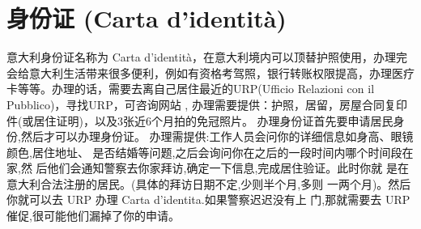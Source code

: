 \section{身份证 (Carta d'identità)}
意大利身份证名称为 Carta d'identità，在意大利境内可以顶替护照使用，办理完会给意大利生活带来很多便利，例如有资格考驾照，银行转账权限提高，办理医疗卡等等。办理的话，需要去离自己居住最近的URP(Ufficio Relazioni con il Pubblico)，寻找URP，可咨询网站 \cite{cid}, 办理需要提供：护照，居留，房屋合同复印件(或居住证明)，以及3张近6个月拍的免冠照片。
办理身份证首先要申请居民身份,然后才可以办理身份证。 办理需提供:工作人员会问你的详细信息如身高、眼镜颜色,居住地址、 是否结婚等问题,之后会询问你在之后的一段时间内哪个时间段在家,然 后他们会通知警察去你家拜访,确定一下信息,完成居住验证。此时你就 是在意大利合法注册的居民。(具体的拜访日期不定,少则半个月,多则 一两个月)。然后你就可以去 URP 办理 Carta d’identita.如果警察迟迟没有上 门,那就需要去 URP 催促,很可能他们漏掉了你的申请。
